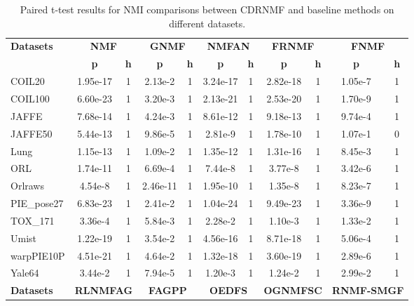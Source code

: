 \documentclass[a4paper,fleqn]{cas-sc}
\begin{document}
\begin{table}[h!]
	\centering
	\caption{Paired t-test results for NMI comparisons between CDRNMF and baseline methods on different datasets.}
	{\footnotesize
	\begin{tabular}{lcccccccccc}
		\toprule
		\textbf{Datasets} & \multicolumn{2}{c}{\textbf{NMF}} & \multicolumn{2}{c}{\textbf{GNMF}} & \multicolumn{2}{c}{\textbf{NMFAN}} & \multicolumn{2}{c}{\textbf{FRNMF}} & \multicolumn{2}{c}{\textbf{FNMF}} \\
		\cmidrule(r){2-3} \cmidrule(r){4-5} \cmidrule(r){6-7} \cmidrule(r){8-9} \cmidrule(r){10-11}
		& \textbf{p} & \textbf{h} & \textbf{p} & \textbf{h} & \textbf{p} & \textbf{h} & \textbf{p} & \textbf{h} & \textbf{p} & \textbf{h} \\
		\midrule
		COIL20 & 1.95e-17 & 1 & 2.13e-2 & 1 & 3.24e-17 & 1 & 2.82e-18 & 1 & 1.05e-7 & 1 \\
		COIL100 & 6.60e-23 & 1 & 3.20e-3 & 1 & 2.13e-21 & 1 & 2.53e-20 & 1 & 1.70e-9 & 1 \\
		JAFFE & 7.68e-14 & 1 & 4.24e-3 & 1 & 8.61e-12 & 1 & 9.18e-13 & 1 & 9.74e-4 & 1 \\
		JAFFE50 & 5.44e-13 & 1 & 9.86e-5 & 1 & 2.81e-9 & 1 & 1.78e-10 & 1 & 1.07e-1 & 0 \\
		Lung & 1.15e-13 & 1 & 1.09e-2 & 1 & 1.35e-12 & 1 & 1.31e-16 & 1 & 8.45e-3 & 1 \\
		ORL & 1.74e-11 & 1 & 6.69e-4 & 1 & 7.44e-8 & 1 & 3.77e-8 & 1 & 3.42e-6 & 1 \\
		Orlraws & 4.54e-8 & 1 & 2.46e-11 & 1 & 1.95e-10 & 1 & 1.35e-8 & 1 & 8.23e-7 & 1 \\
		PIE\_pose27 & 6.83e-23 & 1 & 2.41e-2 & 1 & 1.04e-24 & 1 & 9.49e-23 & 1 & 3.36e-9 & 1 \\
		TOX\_171 & 3.36e-4 & 1 & 5.84e-3 & 1 & 2.28e-2 & 1 & 1.10e-3 & 1 & 1.33e-2 & 1 \\
		Umist & 1.22e-19 & 1 & 3.54e-2 & 1 & 4.56e-16 & 1 & 8.71e-18 & 1 & 5.06e-4 & 1 \\
		warpPIE10P & 4.51e-21 & 1 & 4.64e-2 & 1 & 1.32e-18 & 1 & 3.60e-19 & 1 & 2.89e-6 & 1 \\
		Yale64 & 3.44e-2 & 1 & 7.94e-5 & 1 & 1.20e-3 & 1 & 1.24e-2 & 1 & 2.99e-2 & 1 \\
		\midrule
		\textbf{Datasets} & \multicolumn{2}{c}{\textbf{RLNMFAG}} & \multicolumn{2}{c}{\textbf{FAGPP}} & \multicolumn{2}{c}{\textbf{OEDFS}} & \multicolumn{2}{c}{\textbf{OGNMFSC}} & \multicolumn{2}{c}{\textbf{RNMF-SMGF}} \\
		\cmidrule(r){2-3} \cmidrule(r){4-5} \cmidrule(r){6-7} \cmidrule(r){8-9} \cmidrule(r){10-11}

\end{tabular}}
\end{table}
\end{document}
